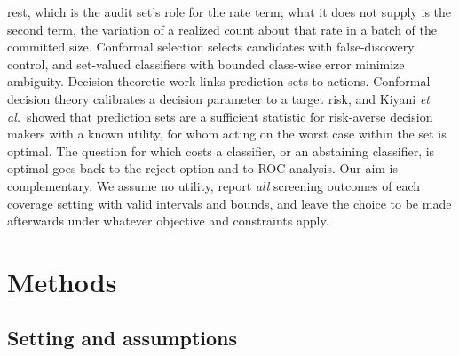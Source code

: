 \documentclass[twocolumn,10pt]{article}
\begin{document}
rest,\citep{Angelopoulos2023PPI} which is the audit set's role for the rate term; what it does
not supply is the second term, the variation of a realized count about that rate in a batch of
the committed size. Conformal selection\citep{JinCandes2023} selects candidates with false-discovery control, and set-valued classifiers with bounded class-wise error\citep{Sadinle2019} minimize ambiguity. Decision-theoretic work links prediction sets to actions. Conformal decision theory calibrates a decision parameter to a target risk,\citep{Lekeufack2024CDT} and Kiyani \textit{et al.}\ showed that prediction sets are a sufficient statistic for risk-averse decision makers with a known utility, for whom acting on the worst case within the set is optimal.\citep{Kiyani2025RAC} The question for which costs a classifier, or an abstaining classifier, is optimal goes back to the reject option\citep{Chow1970} and to ROC analysis.\citep{ProvostFawcett2001,Pietraszek2005} Our aim is complementary. We assume no utility, report \emph{all} screening outcomes of each coverage setting with valid intervals and bounds, and leave the choice to be made afterwards under whatever objective and constraints apply.

\section{Methods}
\label{sec:methods}

\subsection{Setting and assumptions}
\label{sec:methods:setting}
\end{document}
